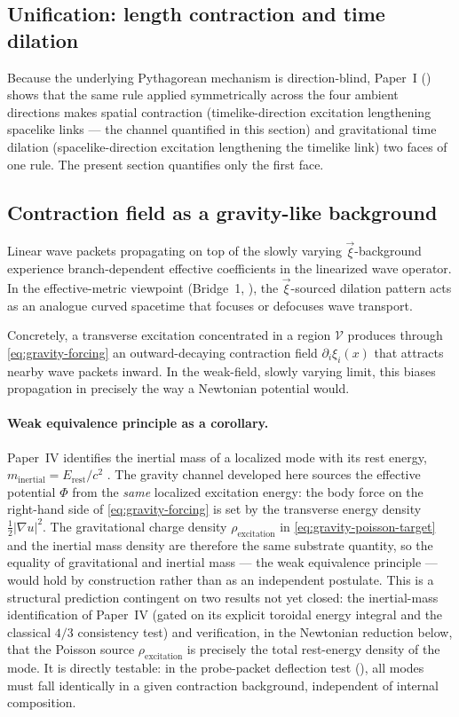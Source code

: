 \subsection{Unification: length contraction and time dilation}

Because the underlying Pythagorean mechanism is direction-blind, Paper~I
() shows that the same rule applied symmetrically across the four
ambient directions makes spatial contraction (timelike-direction excitation lengthening spacelike
links --- the channel quantified in this section) and gravitational time dilation
(spacelike-direction excitation lengthening the timelike link) two faces of one rule.
The present section quantifies only the first face.

\subsection{Contraction field as a gravity-like background}

Linear wave packets propagating on top of the slowly varying $\vec\xi$-background experience
branch-dependent effective coefficients in the linearized wave operator.
In the effective-metric viewpoint (Bridge~1, ), the $\vec\xi$-sourced
dilation pattern acts as an analogue curved spacetime that focuses or defocuses wave transport.

Concretely, a transverse excitation concentrated in a region $\mathcal{V}$ produces through
\eqref{eq:gravity-forcing} an outward-decaying contraction field $\partial_i\xi_i(x)$ that
attracts nearby wave packets inward.
In the weak-field, slowly varying limit, this biases propagation in precisely the way a
Newtonian potential would.

\paragraph{Weak equivalence principle as a corollary.}
Paper~IV identifies the inertial mass of a localized mode with its rest energy,
$m_{\mathrm{inertial}}=E_{\mathrm{rest}}/c^2$ \citep{Einstein1905inertia}.
The gravity channel developed here sources the effective potential $\Phi$ from the
\emph{same} localized excitation energy: the body force on the right-hand side of
\eqref{eq:gravity-forcing} is set by the transverse energy density $\tfrac{1}{2}|\nabla u|^2$.
The gravitational charge density $\rho_{\mathrm{excitation}}$ in \eqref{eq:gravity-poisson-target}
and the inertial mass density are therefore the same substrate quantity, so the equality of
gravitational and inertial mass --- the weak equivalence principle --- would hold by construction
rather than as an independent postulate.
This is a structural prediction contingent on two results not yet closed: the inertial-mass
identification of Paper~IV (gated on its explicit toroidal energy integral and the classical
$4/3$ consistency test) and verification, in the Newtonian reduction below, that the Poisson
source $\rho_{\mathrm{excitation}}$ is precisely the total rest-energy density of the mode.
It is directly testable: in the probe-packet deflection test (),
all modes must fall identically in a given contraction background, independent of internal
composition.

